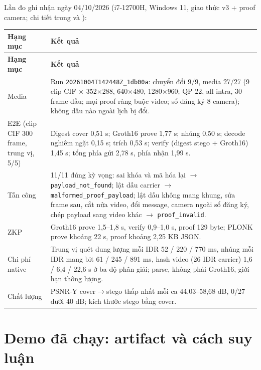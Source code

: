 \documentclass[11pt,a4paper]{article}
\begin{document}
Lần đo ghi nhận ngày 04/10/2026 (i7-12700H, Windows 11, giao thức v3 + proof camera;
chi tiết trong  và ):

\begin{longtable}{P{.3\textwidth}P{.61\textwidth}}
\toprule\textbf{Hạng mục} & \textbf{Kết quả} \\
\midrule\endfirsthead
\toprule\textbf{Hạng mục} & \textbf{Kết quả} \\
\midrule\endhead
Media & Run \texttt{20261004T142448Z\_1db00a}: chuyển đổi 9/9, media 27/27 (9 clip CIF $\times$ 352$\times$288, 640$\times$480, 1280$\times$960; QP 22, all-intra, 30 frame đầu; mọi proof ràng buộc video; sổ đăng ký 8 camera); không dấu nào ngoài lịch bị đổi. \\
E2E (clip CIF 300 frame, trung vị, 5/5) & Digest cover 0,51 s; Groth16 prove 1,77 s; nhúng 0,50 s; decode nghiêm ngặt 0,15 s; trích 0,53 s; verify (digest stego + Groth16) 1,45 s; tổng phía gửi 2,78 s, phía nhận 1,99 s. \\
Tấn công & 11/11 đúng kỳ vọng: sai khóa và mã hóa lại $\to$ \texttt{payload\_not\_found}; lật dấu carrier $\to$ \texttt{malformed\_proof\_payload}; lật dấu không mang khung, sửa frame sau, cắt nửa video, đổi message, camera ngoài sổ đăng ký, chép payload sang video khác $\to$ \texttt{proof\_invalid}. \\
ZKP & Groth16 prove 1,5--1,8 s, verify 0,9--1,0 s, proof 129 byte; PLONK prove khoảng 22 s, proof khoảng 2,25 KB JSON. \\
Chi phí native & Trung vị quét dung lượng mỗi IDR 52 / 220 / 770 ms, nhúng mỗi IDR mang bit 61 / 245 / 891 ms, hash video (26 IDR carrier) 1,6 / 6,4 / 22,6 s ở ba độ phân giải; parse, không phải Groth16, giới hạn thông lượng. \\
Chất lượng & PSNR-Y cover$\to$stego thấp nhất mỗi ca 44,03--58,68 dB, 0/27 dưới 40 dB; kích thước stego bằng cover. \\
\bottomrule\end{longtable}

\section{Demo đã chạy: artifact và cách suy luận}
\end{document}
